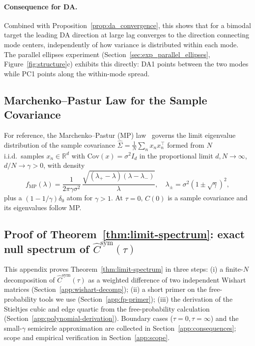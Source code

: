 \documentclass{article}
\newcommand{\R}{\mathbb{R}}
\newcommand{\Cov}{\mathrm{Cov}}
\begin{document}
\paragraph{Consequence for DA.} Combined with
Proposition~\ref{prop:da_convergence}, this shows that for a bimodal target
the leading DA direction at large lag converges to the direction connecting
mode centers, independently of how variance is distributed within each mode.
The parallel ellipses experiment
(Section~\ref{sec:exp_parallel_ellipses}, Figure~\ref{fig:structure}c)
exhibits this directly: DA1 points between the two modes while PC1 points
along the within-mode spread.



\subsection{Marchenko--Pastur Law for the Sample Covariance}
\label{app:mp_law}

For reference, the Marchenko--Pastur (MP) law~\cite{marchenko1967} governs the limit eigenvalue distribution of the sample covariance $\hat{\Sigma} = \frac{1}{N}\sum_n x_n x_n^\top$ formed from $N$ i.i.d.\ samples $x_n \in \R^d$ with $\Cov(x) = \sigma^2 I_d$ in the proportional limit $d,N \to \infty$, $d/N \to \gamma > 0$, with density
\[
f_{\mathrm{MP}}(\lambda) = \frac{1}{2\pi\gamma\sigma^2}\,\frac{\sqrt{(\lambda_+ - \lambda)(\lambda - \lambda_-)}}{\lambda}, \quad \lambda_{\pm} = \sigma^2(1 \pm \sqrt{\gamma})^2,
\]
plus a $(1 - 1/\gamma)\delta_0$ atom for $\gamma > 1$. At $\tau = 0$, $\hat C(0)$ is a sample covariance and its eigenvalues follow MP.

\subsection{Proof of Theorem~\ref{thm:limit-spectrum}: exact null spectrum of $\hat C^{\mathrm{sym}}(\tau)$}
\label{app:limit-spectrum}\label{app:noise_floor}

This appendix proves Theorem~\ref{thm:limit-spectrum} in three steps:
(i) a finite-$N$ decomposition of $\hat C^{\mathrm{sym}}(\tau)$ as a
weighted difference of two independent Wishart matrices
(Section~\ref{app:wishart-decomp});
(ii) a short primer on the free-probability tools we use
(Section~\ref{app:fp-primer});
(iii) the derivation of the Stieltjes cubic and edge quartic from
the free-probability calculation
(Section~\ref{app:polynomial-derivation}).
Boundary cases ($\tau = 0, \tau = \infty$) and the small-$\gamma$
semicircle approximation are collected in
Section~\ref{app:consequences}; scope and empirical verification in
Section~\ref{app:scope}.
\end{document}
